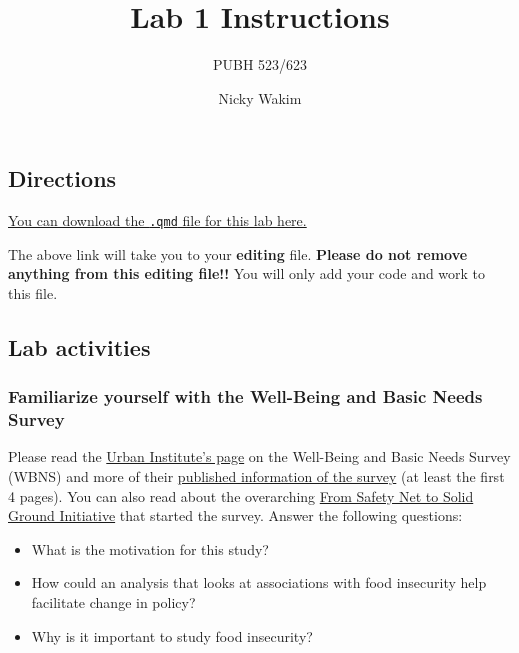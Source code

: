 \documentclass[
  letterpaper,
  DIV=11,
  numbers=noendperiod]{scrartcl}
\title{Lab 1 Instructions}
\subtitle{PUBH 523/623}
\author{Nicky Wakim}
\date{}
\providecommand{\tightlist}{%
  \setlength{\itemsep}{0pt}\setlength{\parskip}{0pt}}
\begin{document}
\maketitle


\subsection{Directions}\label{directions}

\href{https://github.com/nwakim/BSTA_513_26S/blob/main/project/LastName_FirstInit_Lab_01.qmd}{You
can download the \texttt{.qmd} file for this lab here.}

The above link will take you to your \textbf{editing} file.
\textbf{Please do not remove anything from this editing file!!} You will
only add your code and work to this file.

\subsection{Lab activities}\label{lab-activities}

\subsubsection{Familiarize yourself with the Well-Being and Basic Needs
Survey}\label{familiarize-yourself-with-the-well-being-and-basic-needs-survey}

Please read the
\href{https://www.urban.org/policy-centers/health-policy-center/projects/well-being-and-basic-needs-survey}{Urban
Institute's page} on the Well-Being and Basic Needs Survey (WBNS) and
more of their
\href{https://www.urban.org/sites/default/files/publication/98919/the_well-being_and_basic_needs_survey_1.pdf}{published
information of the survey} (at least the first 4 pages). You can also
read about the overarching
\href{https://www.urban.org/tags/safety-net-solid-ground\#about}{From
Safety Net to Solid Ground Initiative} that started the survey. Answer
the following questions:

\begin{itemize}
\tightlist
\item
  What is the motivation for this study?
\item
  How could an analysis that looks at associations with food insecurity
  help facilitate change in policy?
\item
  Why is it important to study food insecurity?
\end{itemize}
\end{document}
